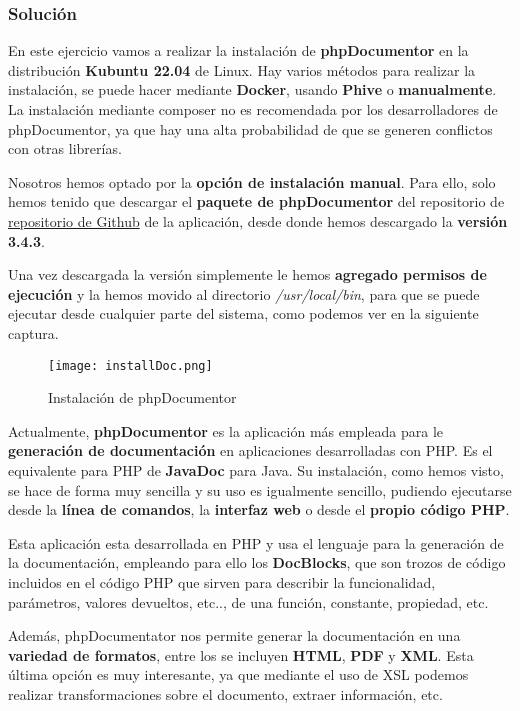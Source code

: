 \subsubsection{Solución}
En este ejercicio vamos a realizar la instalación de \textbf{phpDocumentor} en la distribución \textbf{Kubuntu 22.04} de Linux. Hay varios métodos para realizar la instalación, se puede hacer mediante \textbf{Docker}, usando \textbf{Phive} o \textbf{manualmente}. La instalación mediante composer no es recomendada por los desarrolladores de phpDocumentor, ya que hay una alta probabilidad de que se generen conflictos con otras librerías.

Nosotros hemos optado por la \textbf{opción de instalación manual}. Para ello, solo hemos tenido que descargar el \textbf{paquete de phpDocumentor} del repositorio de \href{https://github.com/phpDocumentor/phpDocumentor/releases}{repositorio de Github} de la aplicación, desde donde hemos descargado la \textbf{versión 3.4.3}.

Una vez descargada la versión simplemente le hemos \textbf{agregado permisos de ejecución} y la hemos movido al directorio \textit{/usr/local/bin}, para que se puede ejecutar desde cualquier parte del sistema, como podemos ver en la siguiente captura.

\begin{figure}[H]
\centering
\texttt{[image: installDoc.png]}
\caption{Instalación de phpDocumentor}
\end{figure}

Actualmente, \textbf{phpDocumentor} es la aplicación más empleada para le \textbf{generación de documentación} en aplicaciones desarrolladas con PHP. Es el equivalente para PHP de \textbf{JavaDoc} para Java. Su instalación, como hemos visto, se hace de forma muy sencilla y su uso es igualmente sencillo, pudiendo ejecutarse desde la \textbf{línea de comandos}, la \textbf{interfaz web} o desde el \textbf{propio código PHP}.

Esta aplicación esta desarrollada en PHP y usa el lenguaje para la generación de la documentación, empleando para ello los \textbf{DocBlocks}, que son trozos de código incluidos en el código PHP que sirven para describir la funcionalidad, parámetros, valores devueltos, etc.., de una función, constante, propiedad, etc.

Además, phpDocumentator nos permite generar la documentación en una \textbf{variedad de formatos}, entre los se incluyen \textbf{HTML}, \textbf{PDF} y \textbf{XML}. Esta última opción es muy interesante, ya que mediante el uso de XSL podemos realizar transformaciones sobre el documento, extraer información, etc.

